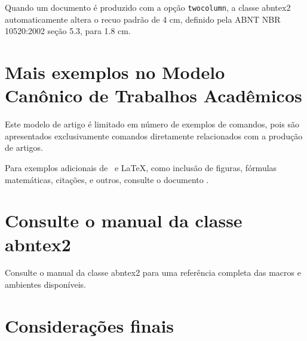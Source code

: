 \documentclass[
	article,			%
	12pt,				%
	twoside,			%
	a4paper,			%
	english,			%
	brazil,				%
	sumario=tradicional
	]{abntex2-modelo-notas-de-aula}
\begin{document}
Quando um documento é produzido com a opção \texttt{twocolumn}, a classe
\textsf{abntex2} automaticamente altera o recuo padrão de 4 cm, definido pela
ABNT NBR 10520:2002 seção 5.3, para 1.8 cm.


\section{Mais exemplos no Modelo Canônico de Trabalhos Acadêmicos}

Este modelo de artigo é limitado em número de exemplos de comandos, pois são
apresentados exclusivamente comandos diretamente relacionados com a produção de
artigos.

Para exemplos adicionais de \abnTeX\ e \LaTeX, como inclusão de figuras,
fórmulas matemáticas, citações, e outros, consulte o documento
.

\section{Consulte o manual da classe \textsf{abntex2}}

Consulte o manual da classe \textsf{abntex2} \cite{abntex2classe} para uma
referência completa das macros e ambientes disponíveis.

% 

\section*{Considerações finais}

\lipsum[1]

\begin{citacao}
\lipsum[2]
\end{citacao}

\lipsum[3]

\postextual






\end{document}
